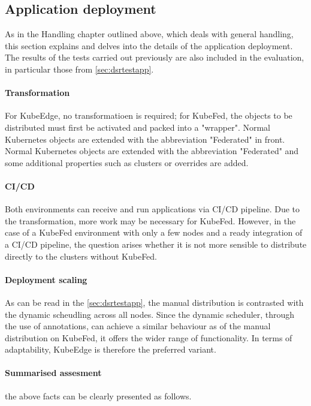 \documentclass[MSC,Master,english]{twbook}%
\begin{document}
\subsection{Application deployment}
As in the Handling chapter outlined above, which deals with general handling, this section explains and delves into the details of the application deployment. The results of the tests carried out previously are also included in the evaluation, in particular those from \autoref{sec:dsrtestapp}.

\paragraph{Transformation} For KubeEdge, no transformatioen is required; for KubeFed, the objects to be distributed must first be activated and packed into a "wrapper". Normal Kubernetes objects are extended with the abbreviation "Federated" in front. Normal Kubernetes objects are extended with the abbreviation "Federated" and some additional properties such as clusters or overrides are added.

\paragraph{CI/CD} Both environments can receive and run applications via \ac{CI/CD} pipeline. Due to the transformation, more work may be necessary for KubeFed. However, in the case of a KubeFed environment with only a few nodes and a ready integration of a CI/CD pipeline, the question arises whether it is not more sensible to distribute directly to the clusters without KubeFed.

\paragraph{Deployment scaling} As can be read in the \autoref{sec:dsrtestapp}, the manual distribution is contrasted with the dynamic scheudling across all nodes. Since the dynamic scheduler, through the use of annotations, can achieve a similar behaviour as of the manual distribution on KubeFed, it offers the wider range of functionality. In terms of adaptability, KubeEdge is therefore the preferred variant.

\paragraph{Summarised assesment} the above facts can be clearly presented as follows.
\end{document}
